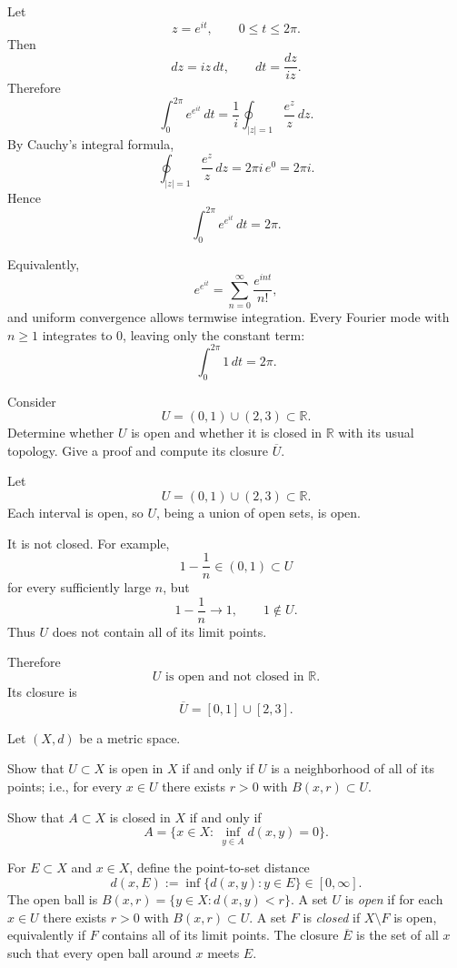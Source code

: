 \begin{solution}
Let
\[
z=e^{it},
\qquad
0\le t\le2\pi.
\]
Then
\[
dz=iz\,dt,
\qquad
dt=\frac{dz}{iz}.
\]
Therefore
\[
\int_0^{2\pi}e^{e^{it}}\,dt
=
\frac1i
\oint_{|z|=1}\frac{e^z}{z}\,dz.
\]
By Cauchy's integral formula,
\[
\oint_{|z|=1}\frac{e^z}{z}\,dz
=
2\pi i\,e^0
=
2\pi i.
\]
Hence
\[
\boxed{
\int_0^{2\pi}e^{e^{it}}\,dt=2\pi.
}
\]

Equivalently,
\[
e^{e^{it}}
=
\sum_{n=0}^{\infty}\frac{e^{int}}{n!},
\]
and uniform convergence allows termwise integration. Every Fourier mode with \(n\ge1\) integrates to \(0\), leaving only the constant term:
\[
\int_0^{2\pi}1\,dt=2\pi.
\]
\end{solution}


\begin{problem}[CP-IV-0122]
\label{prob:cp-iv-0122}
Consider
\[
U=(0,1)\cup(2,3)\subset\mathbb R.
\]
Determine whether $U$ is open and whether it is closed in $\mathbb R$
with its usual topology. Give a proof and compute its closure $\overline U$.
\end{problem}

\begin{solution}
Let
\[
U=(0,1)\cup(2,3)\subset\mathbb R.
\]
Each interval is open, so \(U\), being a union of open sets, is open.

It is not closed. For example,
\[
1-\frac1n\in(0,1)\subset U
\]
for every sufficiently large \(n\), but
\[
1-\frac1n\longrightarrow1,
\qquad
1\notin U.
\]
Thus \(U\) does not contain all of its limit points.

Therefore
\[
\boxed{
U\text{ is open and not closed in }\mathbb R.
}
\]
Its closure is
\[
\overline U=[0,1]\cup[2,3].
\]
\end{solution}


\begin{problem}[CP-IV-0125]
\label{prob:cp-iv-0125}
Let $(X,d)$ be a metric space.

		\par\noindent\textbullet\quad Show that $U\subset X$ is open in $X$ if and only if $U$ is a neighborhood of all of its points; i.e., for every $x\in U$ there exists $r>0$ with $B(x,r)\subset U$.
		\par\noindent\textbullet\quad Show that $A\subset X$ is closed in $X$ if and only if
		\[
		A=\{x\in X:\ \inf_{y\in A} d(x,y)=0\}.
		\]

	For $E\subset X$ and $x\in X$, define the point-to-set distance
	\[
	d(x,E):=\inf\{d(x,y):y\in E\}\in[0,\infty].
	\]
	The open ball is $B(x,r)=\{y\in X: d(x,y)<r\}$. A set $U$ is \emph{open} if for each $x\in U$ there exists $r>0$ with $B(x,r)\subset U$. A set $F$ is \emph{closed} if $X\setminus F$ is open, equivalently if $F$ contains all of its limit points. The closure $\overline{E}$ is the set of all $x$ such that every open ball around $x$ meets $E$.

	\bigskip
\end{problem}

